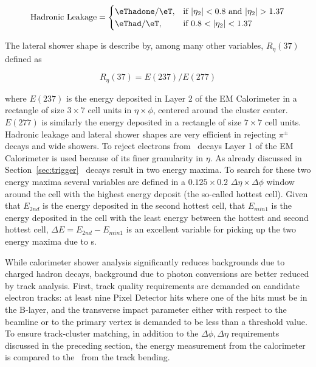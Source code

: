 \begin{equation}
\text{Hadronic Leakage} = \begin{cases} 
														\eThadone/\eT,& \mbox{if } |\eta_2|<0.8 \mbox{ and } |\eta_2|>1.37 \\ 
														\eThad/\eT, & \mbox{if } 0.8<|\eta_2|<1.37  
													\end{cases}
\end{equation}

The lateral shower shape is describe by, among many other variables, $R_\eta(37)$ 
defined as 

\begin{equation}
R_\eta(37) = E(237)/E(277)
\end{equation}
 
where $E(237)$ is the energy deposited in Layer 2 of the EM Calorimeter in a 
rectangle of size $3\times 7$ cell units in $\eta\times\phi$,
centered around the  cluster center. $E(277)$ is similarly the energy deposited 
in a rectangle of size $7\times7$ cell units. Hadronic leakage and lateral 
shower shapes are very efficient in rejecting $\pi^{\pm}$ decays and 
wide showers. To reject electrons from \pizero\ decays Layer 1 of the EM Calorimeter 
is used because of its finer granularity in $\eta$. As already discussed in Section~\ref{sec:trigger} 
\pizero\ decays result in two energy maxima. To search for these two energy maxima several 
variables are defined in a $0.125\times0.2$ $\Delta\eta\times\Delta\phi$ window around the cell 
with the highest energy deposit (the so-called hottest cell). Given that $E_{2nd}$ is 
the energy deposited in the second hottest cell, that $E_{min1}$ is the energy deposited 
in the cell with the least energy between the hottest and second hottest cell, 
$\Delta E = E_{2nd}-E_{min1}$ is an excellent variable for picking up the two 
energy maxima due to \pizero s.  

\par While calorimeter shower analysis significantly reduces backgrounds due to
charged hadron decays, background due to photon conversions are better reduced by 
track analysis. First, track quality requirements are demanded on candidate electron 
tracks: at least nine Pixel Detector hits where one of the hits must be in the B-layer, 
and the transverse impact parameter either with respect to the beamline or to the primary vertex 
is demanded to be less than a threshold value.  
To ensure track-cluster matching, in addition to the $\Delta\phi, \Delta\eta$ requirements 
discussed in the preceding section, the energy measurement from the calorimeter is 
compared to the \pT\ from the track bending. 

